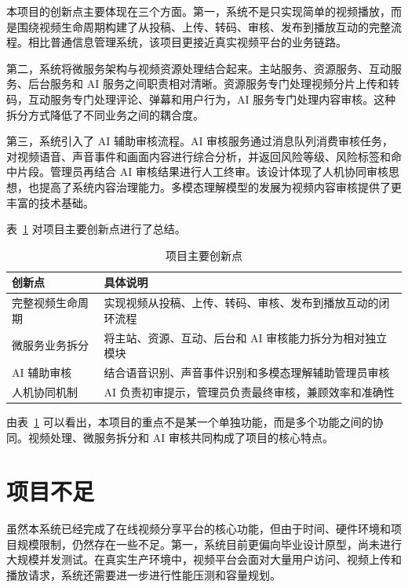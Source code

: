 本项目的创新点主要体现在三个方面。第一，系统不是只实现简单的视频播放，而是围绕视频生命周期构建了从投稿、上传、转码、审核、发布到播放互动的完整流程。相比普通信息管理系统，该项目更接近真实视频平台的业务链路。

第二，系统将微服务架构与视频资源处理结合起来。主站服务、资源服务、互动服务、后台服务和 AI 服务之间职责相对清晰。资源服务专门处理视频分片上传和转码，互动服务专门处理评论、弹幕和用户行为，AI 服务专门处理内容审核。这种拆分方式降低了不同业务之间的耦合度。

第三，系统引入了 AI 辅助审核流程。AI 审核服务通过消息队列消费审核任务，对视频语音、声音事件和画面内容进行综合分析，并返回风险等级、风险标签和命中片段。管理员再结合 AI 审核结果进行人工终审。该设计体现了人机协同审核思想，也提高了系统内容治理能力。多模态理解模型的发展为视频内容审核提供了更丰富的技术基础\cite{bai2023qwen}。

表~\ref{tab:project-innovation} 对项目主要创新点进行了总结。

\begin{table}[htbp]
  \centering
  \caption{项目主要创新点}
  \label{tab:project-innovation}
  \begin{tabular}{p{}p{}}
    \hline
    \textbf{创新点} & \textbf{具体说明} \\
    \hline
    完整视频生命周期 & 实现视频从投稿、上传、转码、审核、发布到播放互动的闭环流程 \\
    微服务业务拆分 & 将主站、资源、互动、后台和 AI 审核能力拆分为相对独立模块 \\
    AI 辅助审核 & 结合语音识别、声音事件识别和多模态理解辅助管理员审核 \\
    人机协同机制 & AI 负责初审提示，管理员负责最终审核，兼顾效率和准确性 \\
    \hline
  \end{tabular}
\end{table}

由表~\ref{tab:project-innovation} 可以看出，本项目的重点不是某一个单独功能，而是多个功能之间的协同。视频处理、微服务拆分和 AI 审核共同构成了项目的核心特点。

\section{项目不足}
\label{sec:project-limitations}

虽然本系统已经完成了在线视频分享平台的核心功能，但由于时间、硬件环境和项目规模限制，仍然存在一些不足。第一，系统目前更偏向毕业设计原型，尚未进行大规模并发测试。在真实生产环境中，视频平台会面对大量用户访问、视频上传和播放请求，系统还需要进一步进行性能压测和容量规划。

